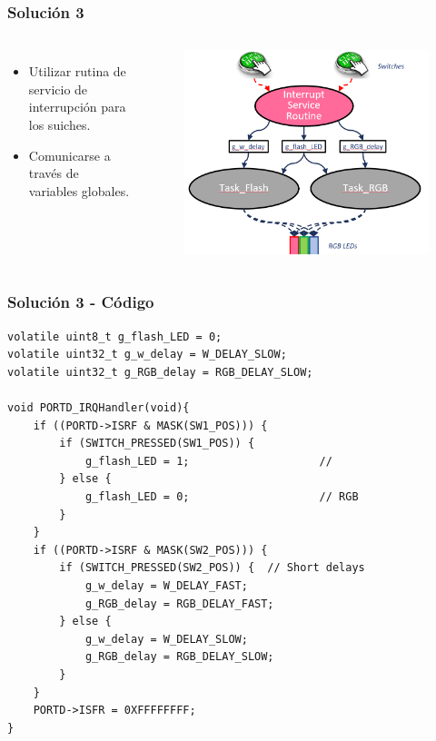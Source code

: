 \documentclass[10.5pt,scale=1.0,t,aspectratio=169,hyperref={pdfpagelabels=false}]{beamer}
\begin{document}
\begin{frame}
	\frametitle{Solución 3}
	\begin{columns}
		\begin{itemize}
			\item Utilizar rutina de servicio de interrupción para los suiches.
			\item Comunicarse a través de variables globales.  
		\end{itemize}
		\begin{figure}
			\centering
			\includegraphics[scale=0.3]{09_solutionV3}
		\end{figure}
	\end{columns}
\end{frame}
\begin{frame}[fragile]
	\frametitle{Solución 3 - Código}

	\begin{lstlisting}[style=CStyle]
volatile uint8_t g_flash_LED = 0;
volatile uint32_t g_w_delay = W_DELAY_SLOW;
volatile uint32_t g_RGB_delay = RGB_DELAY_SLOW;

void PORTD_IRQHandler(void){
	if ((PORTD->ISRF & MASK(SW1_POS))) {
		if (SWITCH_PRESSED(SW1_POS)) {
			g_flash_LED = 1;					// 
		} else {
			g_flash_LED = 0;					// RGB 
		}
	}
	if ((PORTD->ISRF & MASK(SW2_POS))) {
		if (SWITCH_PRESSED(SW2_POS)) {	// Short delays
			g_w_delay = W_DELAY_FAST;
			g_RGB_delay = RGB_DELAY_FAST;
		} else {									
			g_w_delay = W_DELAY_SLOW;
			g_RGB_delay = RGB_DELAY_SLOW;
		}
	}
	PORTD->ISFR = 0XFFFFFFFF;
}
	\end{lstlisting}
\end{frame}
\end{document}
